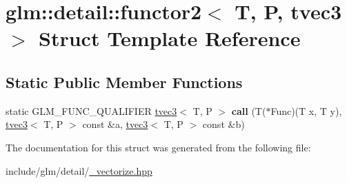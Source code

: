\hypertarget{structglm_1_1detail_1_1functor2_3_01T_00_01P_00_01tvec3_01_4}{}\section{glm\+:\+:detail\+:\+:functor2$<$ T, P, tvec3 $>$ Struct Template Reference}
\label{structglm_1_1detail_1_1functor2_3_01T_00_01P_00_01tvec3_01_4}
\subsection*{Static Public Member Functions}
\begin{DoxyCompactItemize}
\item 
\mbox{\label{structglm_1_1detail_1_1functor2_3_01T_00_01P_00_01tvec3_01_4_a2dc546f8027af1bbceab38b5a2b5a146}} 
static G\+L\+M\+\_\+\+F\+U\+N\+C\+\_\+\+Q\+U\+A\+L\+I\+F\+I\+ER \hyperlink{structglm_1_1tvec3}{tvec3}$<$ T, P $>$ {\bfseries call} (T($\ast$Func)(T x, T y), \hyperlink{structglm_1_1tvec3}{tvec3}$<$ T, P $>$ const \&a, \hyperlink{structglm_1_1tvec3}{tvec3}$<$ T, P $>$ const \&b)
\end{DoxyCompactItemize}


The documentation for this struct was generated from the following file\+:\begin{DoxyCompactItemize}
\item 
include/glm/detail/\hyperlink{__vectorize_8hpp}{\+\_\+vectorize.\+hpp}\end{DoxyCompactItemize}
